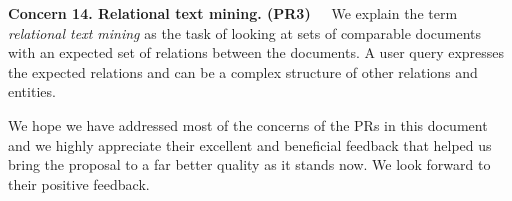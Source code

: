 \documentclass[12pt]{article}
\begin{document}
{\bf Concern 14. Relational text mining. (PR3)~~}
We explain the term {\em relational text mining} as the task of 
looking at sets of comparable documents with an expected set 
of relations between the documents. 
A user query expresses the expected relations and can
be a complex structure of other relations and entities. 

We hope we have addressed most of the concerns of the PRs in this
document and we highly appreciate their excellent and beneficial
feedback that helped us bring the proposal to a far better quality
as it stands now. 
We look forward to their positive feedback. 

\pagebreak
{}
%
%

%
{\small
  
}
\end{document}
